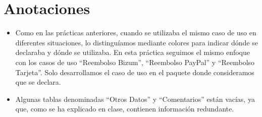 \chapter{Anotaciones}

\begin{itemize}
    \item Como en las prácticas anteriores, cuando se utilizaba el mismo caso de uso en diferentes situaciones, lo distinguíamos mediante colores para indicar dónde se declaraba y dónde se utilizaba. En esta práctica seguimos el mismo enfoque con los casos de uso ``Reembolso Bizum'', ``Reembolso PayPal'' y ``Reembolso Tarjeta''. Solo desarrollamos el caso de uso en el paquete donde consideramos que se declara.
    \item Algunas tablas denominadas ``Otros Datos'' y ``Comentarios'' están vacías, ya que, como se ha explicado en clase, contienen información redundante.
\end{itemize}